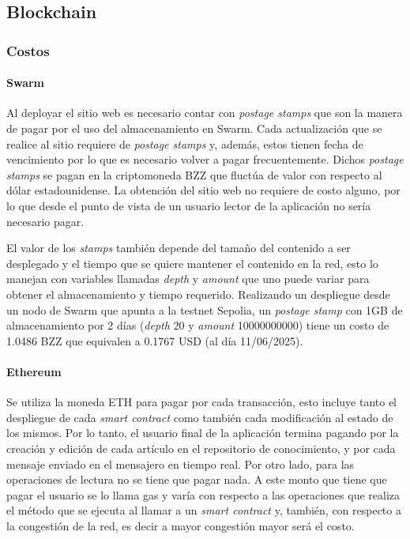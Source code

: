 \subsection{Blockchain}

\subsubsection{Costos}

\paragraph{Swarm}
Al deployar el sitio web es necesario contar con \textit{postage stamps} que son la manera de pagar por el uso del almacenamiento en Swarm. Cada actualización que se realice al sitio requiere de \textit{postage stamps} y, además, estos tienen fecha de vencimiento por lo que es necesario volver a pagar frecuentemente. Dichos \textit{postage stamps} se pagan en la criptomoneda BZZ que fluctúa de valor con respecto al dólar estadounidense. La obtención del sitio web no requiere de costo alguno, por lo que desde el punto de vista de un usuario lector de la aplicación no sería necesario pagar.

El valor de los \textit{stamps} también depende del tamaño del contenido a ser desplegado y el tiempo que se quiere mantener el contenido en la red, esto lo manejan con variables llamadas \textit{depth} y \textit{amount} que uno puede variar para obtener el almacenamiento y tiempo requerido. Realizando un despliegue desde un nodo de Swarm que apunta a la testnet Sepolia, un \textit{postage stamp} con 1GB de almacenamiento por 2 días (\textit{depth} 20 y \textit{amount} 10000000000) tiene un costo de 1.0486 BZZ que equivalen a 0.1767 USD (al día 11/06/2025).

\paragraph{Ethereum}
Se utiliza la moneda ETH para pagar por cada transacción, esto incluye tanto el despliegue de cada \textit{smart contract} como también cada modificación al estado de los mismos. Por lo tanto, el usuario final de la aplicación termina pagando por la creación y edición de cada artículo en el repositorio de conocimiento, y por cada mensaje enviado en el mensajero en tiempo real. Por otro lado, para las operaciones de lectura no se tiene que pagar nada. A este monto que tiene que pagar el usuario se lo llama gas y varía con respecto a las operaciones que realiza el método que se ejecuta al llamar a un \textit{smart contract} y, también, con respecto a la congestión de la red, es decir a mayor congestión mayor será el costo.

